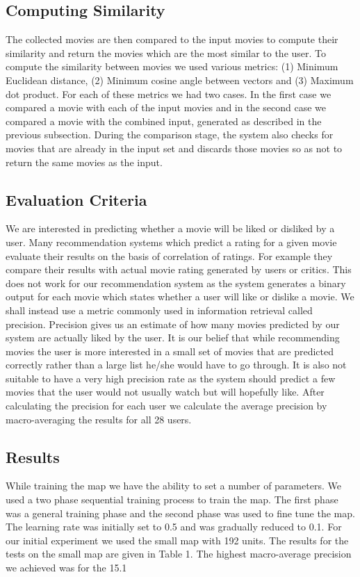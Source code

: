 \documentclass[conference]{IEEEtran}
\begin{document}
\subsection{Computing Similarity}

The collected movies are then compared to the input movies to compute their similarity and return the movies which are the most similar to the user. To compute the similarity between movies we used various metrics: (1) Minimum Euclidean distance, (2) Minimum cosine angle between vectors and (3) Maximum dot product. For each of these metrics we had two cases. In the first case we compared a movie with each of the input movies and in the second case we compared a movie with the combined input, generated as described in the previous subsection. During the comparison stage, the system also checks for movies that are already in the input set and discards those movies so as not to return the same movies as the input.

\subsection{Evaluation Criteria}

We are interested in predicting whether a movie will be liked or disliked by a user. Many recommendation systems which predict a rating for a given movie evaluate their results on the basis of correlation of ratings. For example they compare their results with actual movie rating generated by users or critics. This does not work for our recommendation system as the system generates a binary output for each movie which states whether a user will like or dislike a movie. We shall instead use a metric commonly used in information retrieval called precision. Precision gives us an estimate of how many movies predicted by our system are actually liked by the user. It is our belief that while recommending movies the user is more interested in a small set of movies that are predicted correctly rather than a large list he/she would have to go through. It is also not suitable to have a very high precision rate as the system should predict a few movies that the user would not usually watch but will hopefully like. After calculating the precision for each user we calculate the average precision by macro-averaging the results for all 28 users.

\subsection{Results}
While training the map we have the ability to set a number of parameters. We used a two phase sequential training process to train the map. The first phase was a general training phase and the second phase was used to fine tune the map. The learning rate was initially set to 0.5 and was gradually reduced to 0.1. For our initial experiment we used the small map with 192 units. The results for the tests on the small map are given in Table 1. The highest macro-average precision we achieved was for the 15.1%
\end{document}

